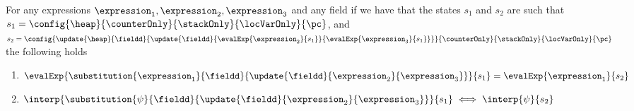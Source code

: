 \begin{substHeap}\label{substHeap}
For any expressions $ \expression_1, \expression_2, \expression_3 $ and any field \fieldd
if we have that the states $s_1$ and $s_2$ are such that
 $s_1 =   \config{\heap}{\counterOnly}{ \stackOnly }{\locVarOnly}{\pc }$,%
 and   $s_2 =  \config{ \update{\heap}{\fieldd }{\update{\fieldd}
                                                   {\evalExp{\expression_2}{ s_1 } }
                                                   {\evalExp{ \expression_3}{ s_1 } } } }
                                          {\counterOnly}{ \stackOnly }{\locVarOnly}{\pc }   $  the following holds
\begin{enumerate}
  \item $ \evalExp{\substitution{\expression_1}{\fieldd}{ \update{ \fieldd  }{\expression_2}{\expression_3} }}{ s_1 } =  \evalExp{\expression_1}{ s_2  }  $
  \item $ \interp{\substitution{\psi}{\fieldd}{ \update{ \fieldd  }{\expression_2}{\expression_3} }}{ s_1 } \iff  \interp{\psi}{ s_2  }  $
\end{enumerate}
\end{substHeap}

